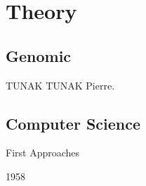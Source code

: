 \section{Theory}

\subsection{Genomic}

\begin{frame}[plain]{TUNAK TUNAK}
Pierre.
\end{frame}

\subsection{Computer Science}

\begin{frame}{First Approaches}
  \begin{block}{1958}
    \cite{fraser1958monte}
  \end{block}
\end{frame}



